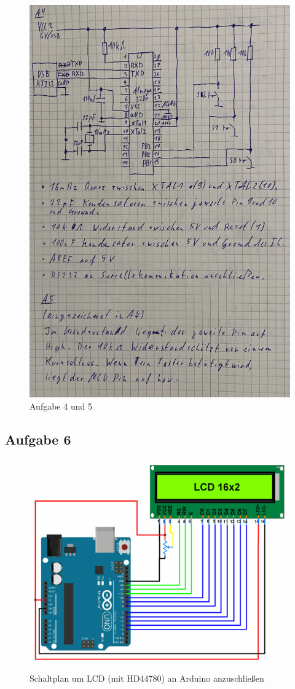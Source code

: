 \documentclass{article}
\begin{document}
\clearpage
\begin{figure}
    \centering
    \includegraphics[width=0.85\linewidth]{A4_to_A5.jpg}
    \caption{Aufgabe 4 und 5}
\end{figure}

\clearpage
\subsection{Aufgabe 6}

\begin{figure}
    \centering
    \includegraphics[width=0.75\linewidth]{LCD_Arduino_Schaltplan.jpg}
    \caption{Schaltplan um LCD (mit HD44780) an Arduino anzuschließen}
    \label{fig:lcd_arduino}
\end{figure}
\end{document}
